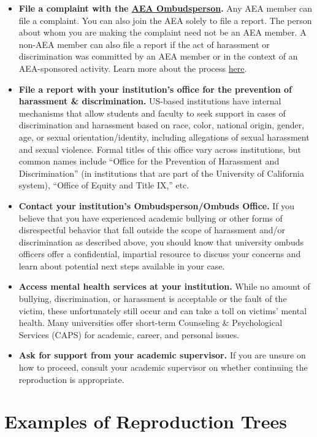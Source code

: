 \documentclass[
  openany]{book}
\providecommand{\tightlist}{%
  \setlength{\itemsep}{0pt}\setlength{\parskip}{0pt}}
\begin{document}
\begin{itemize}
\tightlist
\item
  \textbf{File a complaint with the \href{https://www.aeaweb.org/about-aea/aea-ombudsperson}{AEA Ombudsperson}.} Any AEA member can file a complaint. You can also join the AEA solely to file a report. The person about whom you are making the complaint need not be an AEA member. A non-AEA member can also file a report if the act of harassment or discrimination was committed by an AEA member or in the context of an AEA-sponsored activity. Learn more about the process \href{https://www.aeaweb.org/about-aea/aea-ombudsperson/faq}{here}.
\item
  \textbf{File a report with your institution's office for the prevention of harassment \& discrimination.} US-based institutions have internal mechanisms that allow students and faculty to seek support in cases of discrimination and harassment based on race, color, national origin, gender, age, or sexual orientation/identity, including allegations of sexual harassment and sexual violence. Formal titles of this office vary across institutions, but common names include ``Office for the Prevention of Harassment and Discrimination'' (in institutions that are part of the University of California system), ``Office of Equity and Title IX,'' etc.
\item
  \textbf{Contact your institution's Ombudsperson/Ombuds Office.} If you believe that you have experienced academic bullying or other forms of disrespectful behavior that fall outside the scope of harassment and/or discrimination as described above, you should know that university ombuds officers offer a confidential, impartial resource to discuss your concerns and learn about potential next steps available in your case.
\item
  \textbf{Access mental health services at your institution.} While no amount of bullying, discrimination, or harassment is acceptable or the fault of the victim, these unfortunately still occur and can take a toll on victims' mental health. Many universities offer short-term Counseling \& Psychological Services (CAPS) for academic, career, and personal issues.
\item
  \textbf{Ask for support from your academic supervisor.} If you are unsure on how to proceed, consult your academic supervisor on whether continuing the reproduction is appropriate.
\end{itemize}

\hypertarget{examples-of-reproduction-trees}{%
\chapter{Examples of Reproduction Trees}\label{examples-of-reproduction-trees}}
\end{document}
